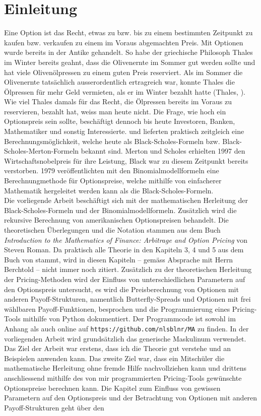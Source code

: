 \documentclass[11pt]{report} %
\begin{document}
\chapter{Einleitung}
Eine Option ist das Recht, etwas zu bzw. bis zu einem bestimmten Zeitpunkt zu kaufen bzw. verkaufen zu einem im Voraus abgemachten Preis. Mit Optionen wurde bereits in der Antike gehandelt. So habe der griechische Philosoph Thales im Winter bereits geahnt, dass die Olivenernte im Sommer gut werden sollte und hat viele Olivenölpressen zu einem guten Preis reserviert. Als im Sommer die Olivenernte tatsächlich ausserordentlich ertragreich war, konnte Thales die Ölpressen für mehr Geld vermieten, als er im Winter bezahlt hatte (Thales, \cite{wikithales2024}). Wie viel Thales damals für das Recht, die Ölpressen bereits im Voraus zu reservieren, bezahlt hat, weiss man heute nicht. Die Frage, wie hoch ein Optionspreis sein sollte, beschäftigt dennoch bis heute Investoren, Banken, Mathematiker und sonstig Interessierte. \textcite{Black1973} und \textcite{Merton1973} lieferten praktisch zeitgleich eine Berechnungsmöglichkeit, welche heute als Black-Scholes-Formeln bzw. Black-Scholes-Merton-Formeln bekannt sind. Merton und Scholes erhielten 1997 den Wirtschaftsnobelpreis für ihre Leistung, Black war zu diesem Zeitpunkt bereits verstorben. 1979 veröffentlichten \textcite{Cox1979} mit den Binomialmodellformeln eine Berechnungmethode für Optionspreise, welche mithilfe von einfacherer Mathematik hergeleitet werden kann als die Black-Scholes-Formeln.\\Die vorliegende Arbeit beschäftigt sich mit der mathematischen Herleitung der Black-Scholes-Formeln und der Binomialmodellformeln. Zusätzlich wird die rekursive Berechnung von amerikanischen Optionspreisen behandelt. Die theoretischen Überlegungen und die Notation stammen aus dem Buch \textit{Introduction to the Mathematics of Finance: Arbitrage and Option Pricing} von Steven Roman. Da praktisch alle Theorie in den Kapiteln 3, 4 und 5 aus dem Buch von \textcite{Roman2012-sk} stammt, wird in diesen Kapiteln -- gemäss Absprache mit Herrn Berchtold -- nicht immer noch zitiert. Zusätzlich zu der theoretischen Herleitung der Pricing-Methoden wird der Einfluss von unterschiedlichen Parametern auf den Optionspreis untersucht, es wird die Preisberechnung von Optionen mit anderen Payoff-Strukturen, namentlich Butterfly-Spreads und Optionen mit frei wählbaren Payoff-Funktionen, besprochen und die Programmierung eines Pricing-Tools mithilfe von Python dokumentiert. Der Programmcode ist sowohl im Anhang als auch online auf \texttt{https://github.com/nlsblnr/MA} zu finden. In der vorliegenden Arbeit wird grundsätzlich das generische Maskulinum verwendet.\\Das Ziel der Arbeit war erstens, dass ich die Theorie gut verstehe und an Beispielen anwenden kann. Das zweite Ziel war, dass ein Mitschüler die mathematische Herleitung ohne fremde Hilfe nachvollziehen kann und drittens anschliessend mithilfe des von mir programmierten Pricing-Tools gewünschte Optionspreise berechnen kann. Die Kapitel zum Einfluss von gewissen Parametern auf den Optionspreis und der Betrachtung von Optionen mit anderen Payoff-Strukturen geht über den 
\end{document}
